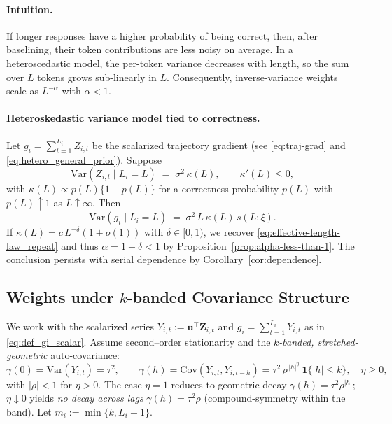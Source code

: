 \paragraph{Intuition.}
If longer responses have a higher probability of being correct, then, after baselining, their token contributions are less noisy on average. In a heteroscedastic model, the per-token variance decreases with length, so the sum over $L$ tokens grows sub-linearly in $L$. Consequently, inverse-variance weights scale as $L^{-\alpha}$ with $\alpha<1$.

\paragraph{Heteroskedastic variance model tied to correctness.}
Let $g_i=\sum_{t=1}^{L_i} Z_{i,t}$ be the scalarized trajectory gradient (see \eqref{eq:traj-grad} and \eqref{eq:hetero_general_prior}). Suppose
\begin{equation}
  \mathrm{Var}(Z_{i,t}\mid L_i=L)\;=\;\sigma^2\,\kappa(L),
  \qquad
  \kappa'(L)\le 0,
\end{equation}
with $\kappa(L)\propto p(L)\{1-p(L)\}$ for a correctness probability $p(L)$ with $p(L)\uparrow 1$ as $L\uparrow\infty$. Then
\begin{equation}
  \mathrm{Var}(g_i\mid L_i=L)\;=\;\sigma^2\,L\,\kappa(L)\,s(L;\xi).
\end{equation}
If $\kappa(L)=c\,L^{-\delta}(1+o(1))$ with $\delta\in[0,1)$, we recover \eqref{eq:effective-length-law_repeat} and thus $\alpha=1-\delta<1$ by Proposition~\ref{prop:alpha-less-than-1}. The conclusion persists with serial dependence by Corollary~\ref{cor:dependence}.


\subsection{Weights under \texorpdfstring{$k$}{k}-banded Covariance Structure}\label{subsec:kband-eta}

We work with the scalarized series $Y_{i,t}:=\bm{u}^\top \boldsymbol{Z}_{i,t}$ and $g_i=\sum_{t=1}^{L_i}Y_{i,t}$ as in \eqref{eq:def_gi_scalar}. Assume second–order stationarity and the \emph{$k$-banded, stretched-geometric} auto-covariance:
\begin{equation}
\gamma(0)=\mathrm{Var}(Y_{i,t})=\tau^2,\qquad
\gamma(h)=\mathrm{Cov}(Y_{i,t},Y_{i,t-h})=\tau^2\,\rho^{\,|h|^{\eta}}\ \mathbf{1}\{|h|\le k\},
\quad \eta\ge 0,
\label{eq:kband-stretch}
\end{equation}
with $|\rho|<1$ for $\eta>0$. The case $\eta=1$ reduces to geometric decay $\gamma(h)=\tau^2\rho^{|h|}$; $\eta\downarrow 0$ yields \emph{no decay across lags} $\gamma(h)=\tau^2\rho$ (compound-symmetry within the band). Let $m_i:=\min\{k,L_i-1\}$.

